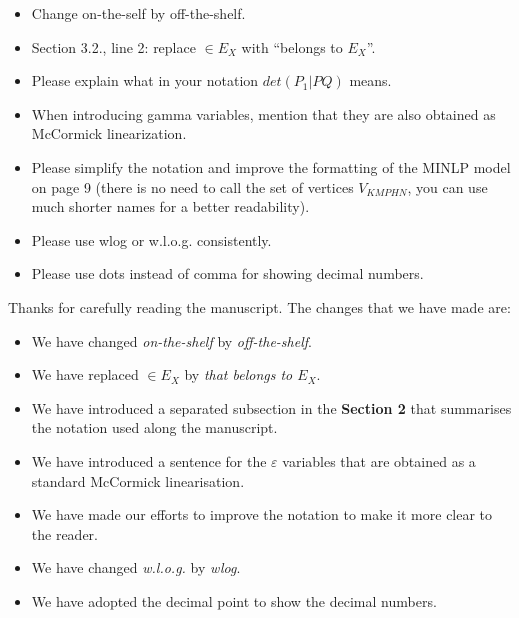 \documentclass{article}
\newenvironment{reviewer}{\setcounter{pointcounter}{1}}{}
\newcommand{\point}{\text{{\selectfont \thepointcounter} \stepcounter{pointcounter}}}
\begin{document}
\begin{reviewer}
		\begin{itshape}
			\begin{itemize}
				\item Change on-the-self by off-the-shelf.
				\item Section 3.2., line 2: replace $\in E_X$ with ``belongs to $E_X$''.
				\item Please explain what in your notation $det(P_1|PQ)$ means.
				\item When introducing gamma variables, mention that they are also obtained as McCormick linearization.
				\item Please simplify the notation and improve the formatting of the MINLP model on page 9 (there is no need to call the set of vertices $V_{KMPHN}$, you can use much shorter names for a better readability).
				\item Please use wlog or w.l.o.g. consistently.
				\item Please use dots instead of comma for showing decimal numbers.
			\end{itemize}
		\end{itshape}
	
		\begin{tcolorbox}[breakable,enhanced,coltitle=black,colback=green!5!white,colframe=green!75!black,title=\textbf{Answer R2.\point},borderline={1pt}{0pt}{black},boxrule=0pt]
			Thanks for carefully reading the manuscript. The changes that we have made are:
			\begin{itemize}
				\item We have changed \textit{on-the-shelf} by \textit{off-the-shelf}.
				\item We have replaced $\in E_X$ by \textit{ that belongs to $E_X$}.
				\item We have introduced a separated subsection in the \textbf{Section 2} that summarises the notation used along the manuscript.
				\item We have introduced a sentence for the $\varepsilon$ variables that are obtained as a standard McCormick linearisation.
				\item We have made our efforts to improve the notation to make it more clear to the reader.
				\item We have changed \textit{w.l.o.g.} by \textit{wlog}.
				\item We have adopted the decimal point to show the decimal numbers.
			\end{itemize}
		\end{tcolorbox}
	\end{reviewer}
	
	
	
	
	
\end{document}

